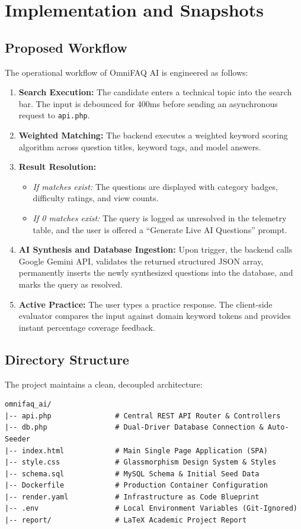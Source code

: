\chapter{Implementation and Snapshots}

\section{Proposed Workflow}
The operational workflow of OmniFAQ AI is engineered as follows:
\begin{enumerate}
    \item \textbf{Search Execution:} The candidate enters a technical topic into the search bar. The input is debounced for 400ms before sending an asynchronous request to \texttt{api.php}.
    \item \textbf{Weighted Matching:} The backend executes a weighted keyword scoring algorithm across question titles, keyword tags, and model answers.
    \item \textbf{Result Resolution:}
    \begin{itemize}
        \item \textit{If matches exist:} The questions are displayed with category badges, difficulty ratings, and view counts.
        \item \textit{If 0 matches exist:} The query is logged as unresolved in the telemetry table, and the user is offered a ``Generate Live AI Questions'' prompt.
    \end{itemize}
    \item \textbf{AI Synthesis and Database Ingestion:} Upon trigger, the backend calls Google Gemini API, validates the returned structured JSON array, permanently inserts the newly synthesized questions into the database, and marks the query as resolved.
    \item \textbf{Active Practice:} The user types a practice response. The client-side evaluator compares the input against domain keyword tokens and provides instant percentage coverage feedback.
\end{enumerate}

\section{Directory Structure}
The project maintains a clean, decoupled architecture:
\begin{verbatim}
omnifaq_ai/
|-- api.php               # Central REST API Router & Controllers
|-- db.php                # Dual-Driver Database Connection & Auto-Seeder
|-- index.html            # Main Single Page Application (SPA)
|-- style.css             # Glassmorphism Design System & Styles
|-- schema.sql            # MySQL Schema & Initial Seed Data
|-- Dockerfile            # Production Container Configuration
|-- render.yaml           # Infrastructure as Code Blueprint
|-- .env                  # Local Environment Variables (Git-Ignored)
|-- report/               # LaTeX Academic Project Report
\end{verbatim}

